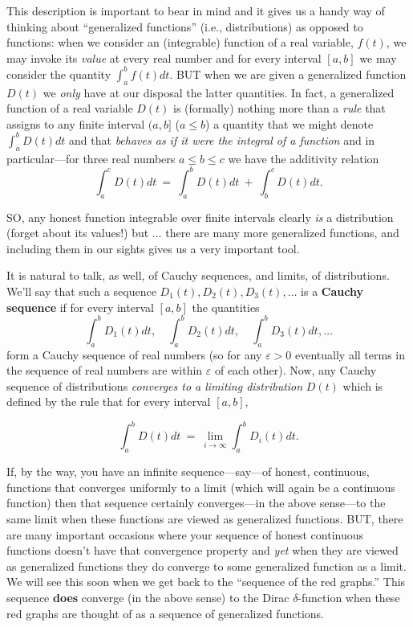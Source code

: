 \documentclass[openany]{book}
\theoremstyle{plain}
\theoremstyle{definition}
\begin{document}
{This description is important to bear in mind and it gives us a handy
way of thinking about ``generalized functions'' (i.e., distributions)
as opposed to functions: when we consider an (integrable) function of
a real variable, $f(t)$, we may invoke its {\it value} at every real
number and for every interval $[a,b]$ we may consider the quantity
$\int_a^bf(t)dt$. BUT when we are given a generalized function $D(t)$
we {\it only} have at our disposal the latter quantities.  In fact, a
generalized function of a real variable $D(t)$ is (formally) nothing
more than a {\it rule} that assigns to any finite interval $(a,b]$ ($a
\le b$) a quantity that we might denote $\int_a^bD(t)dt$ and that {\it
  behaves as if it were the integral of a function} and in
particular---for three real numbers $a\le b\le c$ we have the
additivity relation
 $$  \int_a^cD(t)dt \ = \ \int_a^bD(t)dt \ + \ \int_b^cD(t)dt.$$

 SO, any honest function integrable over finite intervals clearly {\it
   is} a distribution (forget about its values!) but $\dots$ there are
 many more generalized functions, and including them in our sights
 gives us a very important tool.


 It is natural to talk, as well, of Cauchy sequences, and limits, of
 distributions. We'll say that such a sequence $D_1(t), D_2(t),
 D_3(t),\dots$ is a {\bf Cauchy sequence} if for every interval
 $[a,b]$ the quantities $$\int_a^bD_1(t)dt,\quad
 \int_a^bD_2(t)dt,\quad\int_a^bD_3(t)dt,\dots$$ form a Cauchy sequence
 of real numbers (so for any $\varepsilon>0$ eventually all terms
 in the sequence of real numbers
 are within $\varepsilon$ of each other).
 Now, any Cauchy sequence of distributions {\it
   converges to a limiting distribution} $D(t)$ which is defined by
 the rule that for every interval $[a,b]$,

  $$ \int_a^bD(t)dt\ =\ \lim_{i \to \infty} \int_a^bD_i(t)dt.$$


  If, by the way, you have an infinite sequence---say---of honest,
  continuous, functions that converges uniformly to a limit (which
  will again be a continuous function) then that sequence certainly
  converges---in the above sense---to the same limit when these
  functions are viewed as generalized functions. BUT, there are many
  important occasions where your sequence of honest continuous
  functions doesn't have that convergence property and {\it yet} when
  they are viewed as generalized functions they do converge to some
  generalized function as a limit. We will see this soon when we get
  back to the ``sequence of the red graphs.'' This sequence {\bf does}
  converge (in the above sense) to the Dirac $\delta$-function when
  these red graphs are thought of as a sequence of generalized
  functions.




}
\end{document}
